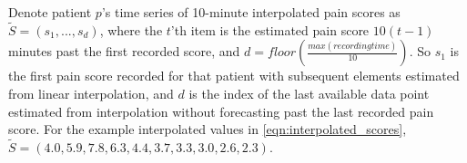 Denote patient $p$'s time series of 10-minute interpolated pain scores as $\tilde{S}=(s_1,...,s_d)$, where the $t$'th item is the estimated pain score $10(t-1)$ minutes past the first recorded score, and $d=floor\left(\frac{max(recording time)}{10}\right)$. So $s_1$ is the first pain score recorded for that patient with subsequent elements estimated from linear interpolation, and $d$ is the index of the last available data point estimated from interpolation without forecasting past the last recorded pain score. For the example interpolated values in \eqref{eqn:interpolated_scores}, $\tilde{S}=(4.0, 5.9, 7.8, 6.3, 4.4, 3.7, 3.3, 3.0, 2.6, 2.3)$. 